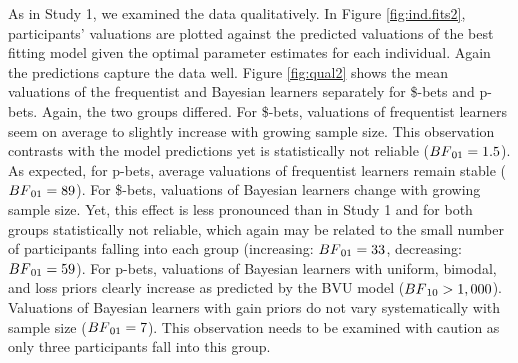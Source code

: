 \documentclass[a4paper, man, natbib, floatsintext]{apa6} %
\begin{document}
As in Study 1, we examined the data qualitatively. In Figure \ref{fig:ind.fits2}, participants' valuations are plotted against the predicted valuations of the best fitting model given the optimal parameter estimates for each individual. Again the predictions capture the data well. Figure \ref{fig:qual2} shows the mean valuations of the frequentist and Bayesian learners separately for \$-bets and p-bets. Again, the two groups differed. 
For \$-bets, valuations of frequentist learners seem on average to slightly increase with growing sample size. This observation contrasts with the model predictions yet is statistically not reliable ($BF\textsubscript{01} = 1.5$).  As expected, for p-bets, average valuations of frequentist learners remain stable ($BF\textsubscript{01} = 89$). For \$-bets, valuations of Bayesian learners change  with growing sample size. Yet, this effect is less pronounced than in Study 1 and for both groups statistically not reliable, which again may be related to the small number of participants falling into each group (increasing: $BF\textsubscript{01} = 33$, decreasing: $BF\textsubscript{01} = 59$). For p-bets, valuations of Bayesian learners with uniform, bimodal, and loss priors clearly increase as predicted by the BVU model ($BF\textsubscript{10} > 1,000$).
Valuations of Bayesian learners with gain priors do not vary systematically with sample size ($BF\textsubscript{01} = 7$). This observation needs to be examined with caution as only three participants fall into this group.
\end{document}
